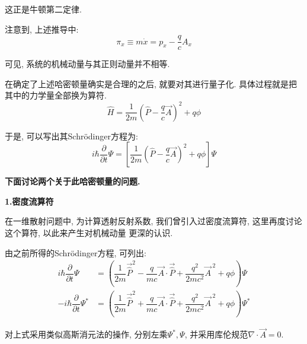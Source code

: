 \documentclass[a4paper, 11pt]{article}
\begin{document}
\begin{spacing}{1.2}
        这正是牛顿第二定律.

        注意到, 上述推导中:
        \begin{equation}
          \pi_x\equiv{}m\dot{x}=p_x-\dfrac{q}{c}A_x
        \end{equation}

        可见, 系统的机械动量与其正则动量并不相等.

        在确定了上述哈密顿量确实是合理的之后, 就要对其进行量子化. 具体过程就是把其中的力学量全部换为算符. 
        \begin{equation}
          \hat{H} = \dfrac{1}{2m}\left(\hat{P}-\dfrac{q}{c}\vec{A}\right)^2+q\phi
        \end{equation}

        于是, 可以写出其Schr\"odinger方程为:
        \begin{equation}
          i\hbar\dfrac{\partial}{\partial{}t}\Psi = 
          \left[\dfrac{1}{2m}\left(\hat{P}-\dfrac{q}{c}\vec{A}\right)^2+q\phi\right]\Psi
        \end{equation}

        \textbf{下面讨论两个关于此哈密顿量的问题.}

        \textbf{1.密度流算符}

        在一维散射问题中, 为计算透射反射系数, 我们曾引入过密度流算符, 这里再度讨论这个算符, 以此来产生对机械动量
        更深的认识.

        由之前所得的Schr\"odinger方程, 可列出:
        \begin{equation}
          \begin{aligned}
            i\hbar\dfrac{\partial}{\partial{}t}\Psi &= 
            \left(\dfrac{1}{2m}\vec{\hat{P}}^2-\dfrac{q}{mc}\vec{A}\cdot\vec{\hat{P}}+
            \dfrac{q^2}{2mc^2}\vec{A}^{\;2}+q\phi\right)\Psi\\
            -i\hbar\dfrac{\partial}{\partial{}t}\Psi^* &= 
            \left(\dfrac{1}{2m}\vec{\hat{P}}^2+\dfrac{q}{mc}\vec{A}\cdot\vec{\hat{P}}+
            \dfrac{q^2}{2mc^2}\vec{A}^{\;2}+q\phi\right)\Psi^*
          \end{aligned}
        \end{equation}
        
        对上式采用类似高斯消元法的操作, 分别左乘$\Psi^*, \Psi$, 并采用库伦规范$\nabla\cdot\vec{A}=0$.
        

\end{spacing}
\end{document}

